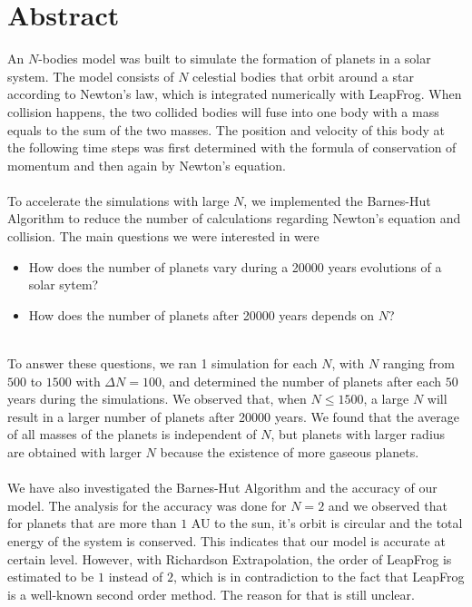 \section*{Abstract}
An $N$-bodies model was built to simulate the formation of planets in a solar system. The model consists of $N$ celestial bodies that orbit around a star according to Newton's law, which is integrated numerically with LeapFrog. When collision happens, the two collided bodies will fuse into one body with a mass equals to the sum of the two masses. The position and velocity of this body at the following time steps was first  determined with the formula of conservation of momentum and then again by Newton's equation.\\
\\
To accelerate the simulations with large $N$, we implemented the Barnes-Hut Algorithm to reduce the number of calculations regarding Newton's equation and collision. The main questions we were interested in were
\begin{itemize}
\item How does the number of planets vary during a 20000 years evolutions of a solar sytem?

\item How does the number of planets after 20000 years depends on $N$?
\end{itemize}
\leavevmode
\\
To answer these questions, we ran 1 simulation for each $N$, with $N$ ranging from $500$ to $1500$ with $\Delta N=100$, and determined the number of planets after each $50$ years during the simulations. We observed that, when $N\leq 1500$, a large $N$ will result in a larger number of planets after 20000 years. We found that the average of all masses of the planets is independent of $N$, but planets with larger radius are obtained with larger $N$ because the existence of more gaseous planets.\\
\\
We have also investigated the Barnes-Hut Algorithm and the accuracy of our model. The analysis for the accuracy was done for $N=2$ and we observed that for planets that are more than $1$ AU to the sun, it's orbit is circular and the total energy of the system is conserved. This indicates that our model is accurate at certain level. However, with Richardson Extrapolation, the order of LeapFrog is estimated to be $1$ instead of $2$, which is in contradiction to the fact that LeapFrog is a well-known second order method. The reason for that is still unclear.